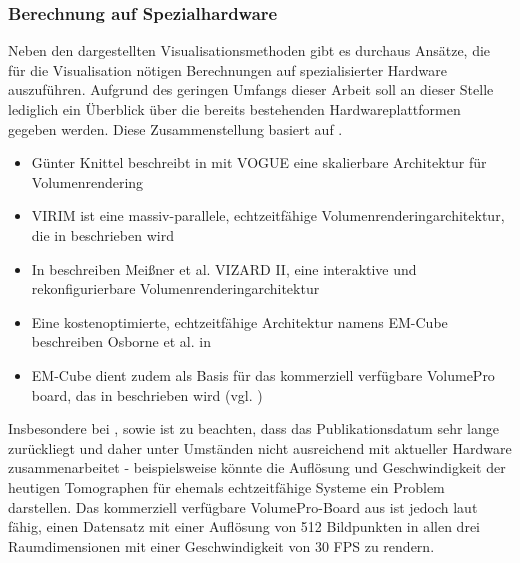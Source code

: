 \documentclass[pdftex,a4paper,titlepage,12pt]{scrartcl}
\newtheorem[L]{boxedDefinition}{Definition}
\begin{document}
\subsubsection{Berechnung auf Spezialhardware}\label{sssec:specialhardwarecalculation}
Neben den dargestellten Visualisationsmethoden gibt es durchaus Ansätze, die für die Visualisation nötigen Berechnungen auf spezialisierter Hardware auszuführen. Aufgrund des geringen Umfangs dieser Arbeit soll an dieser Stelle lediglich ein Überblick über die bereits bestehenden Hardwareplattformen gegeben werden. Diese Zusammenstellung basiert auf \cite[Kapitel 2.5.5, Seite 14]{Bruckner2004}.
\begin{itemize}
 \item Günter Knittel beschreibt in \cite{Knittel1995} mit VOGUE eine skalierbare Architektur für Volumenrendering
 \item VIRIM ist eine massiv-parallele, echtzeitfähige Volumenrenderingarchitektur, die in \cite{Guenther1995} beschrieben wird
 \item In \cite{Meissner2002} beschreiben Meißner et al. VIZARD II, eine interaktive und rekonfigurierbare Volumenrenderingarchitektur
 \item Eine kostenoptimierte, echtzeitfähige Architektur namens EM-Cube beschreiben Osborne et al. in \cite{Osborne1997}
 \item EM-Cube dient zudem als Basis für das kommerziell verfügbare VolumePro board, das in \cite{Pfister1999} beschrieben wird (vgl. \cite[Kapitel 2.2.5, Seite 14]{Bruckner2004})
\end{itemize}
Insbesondere bei \cite{Knittel1995}, \cite{Guenther1995} sowie \cite{Osborne1997} ist zu beachten, dass das Publikationsdatum sehr lange zurückliegt und daher unter Umständen nicht ausreichend mit aktueller Hardware zusammenarbeitet - beispielsweise könnte die Auflösung und Geschwindigkeit der heutigen Tomographen für ehemals echtzeitfähige Systeme ein Problem darstellen. Das kommerziell verfügbare VolumePro-Board aus \cite{Pfister1999} ist jedoch laut \cite[Kapitel 2.2.5, Seite 14]{Bruckner2004} fähig, einen Datensatz mit einer Auflösung von 512 Bildpunkten in allen drei Raumdimensionen mit einer Geschwindigkeit von 30 FPS zu rendern.
\end{document}
